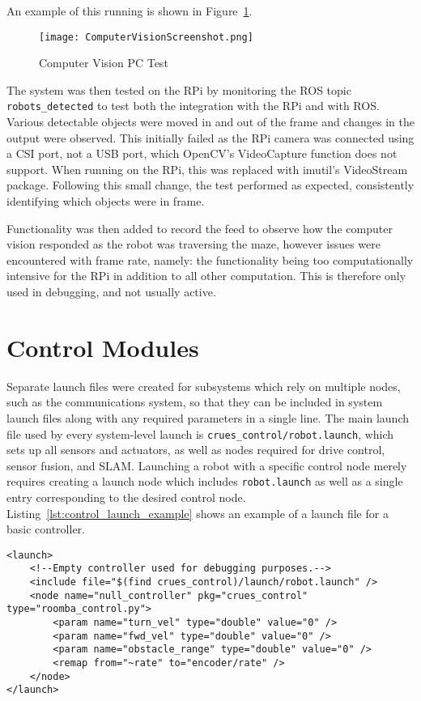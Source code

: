 An example of this running is shown in Figure~\ref{fig:cv_screenshot}.

\begin{figure}[!ht]
	\centering
	\texttt{[image: ComputerVisionScreenshot.png]}
	\caption{Computer Vision PC Test}\label{fig:cv_screenshot}
\end{figure}

The system was then tested on the RPi by monitoring the ROS topic \verb|robots_detected| to
test both the integration with the RPi and with ROS. Various detectable objects were moved in
and out of the frame and changes in the output were observed. This initially failed as the RPi
camera was connected using a CSI port, not a USB port, which OpenCV's VideoCapture function
does not support. When running on the RPi, this was replaced with imutil's VideoStream package.
Following this small change, the test performed as expected, consistently identifying which
objects were in frame.

Functionality was then added to record the feed to observe how the computer vision responded as
the robot was traversing the maze, however issues were encountered with frame rate, namely:
the functionality being too computationally intensive for the RPi in addition to all other
computation. This is therefore only used in debugging, and not usually active.

\section{Control Modules}\label{soft/control}


Separate launch files were created for subsystems which rely on multiple nodes,
such as the communications system, so that they can be included in system launch
files along with any required parameters in a single line. The main launch file
used by every system-level launch is \verb|crues_control/robot.launch|, which
sets up all sensors and actuators, as well as nodes required for drive control,
sensor fusion, and SLAM. Launching a robot with a specific control node
merely requires creating a launch node which includes \verb|robot.launch| as
well as a single entry corresponding to the desired control node.
Listing~\ref{lst:control_launch_example} shows an example of a launch file for
a basic controller.

\begin{lstlisting}[caption={Launch file for null controller}, label={lst:control_launch_example}, style=xml]
<launch>
    <!--Empty controller used for debugging purposes.-->
    <include file="$(find crues_control)/launch/robot.launch" />
    <node name="null_controller" pkg="crues_control" type="roomba_control.py">
        <param name="turn_vel" type="double" value="0" />
        <param name="fwd_vel" type="double" value="0" />
        <param name="obstacle_range" type="double" value="0" />
        <remap from="~rate" to="encoder/rate" />
    </node>
</launch>
\end{lstlisting}


